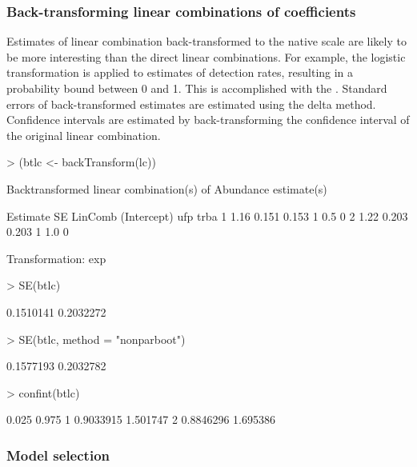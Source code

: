 \documentclass[article,shortnames]{jss}
\begin{document}
\subsubsection{Back-transforming linear combinations of coefficients}

Estimates of linear combination back-transformed to the native scale
are likely to be more interesting than the direct linear combinations.
For example, the logistic transformation is applied to estimates of
detection rates, resulting in a probability bound between 0 and
1. This is accomplished with the .  Standard
errors of back-transformed estimates are estimated using the delta
method.  Confidence intervals are estimated by back-transforming the
confidence interval of the original linear combination.

\begin{Schunk}
\begin{Sinput}
> (btlc <- backTransform(lc))
\end{Sinput}
\begin{Soutput}
Backtransformed linear combination(s) of Abundance estimate(s)

  Estimate    SE LinComb (Intercept) ufp trba
1     1.16 0.151   0.153           1 0.5    0
2     1.22 0.203   0.203           1 1.0    0

Transformation: exp 
\end{Soutput}
\begin{Sinput}
> SE(btlc)
\end{Sinput}
\begin{Soutput}
[1] 0.1510141 0.2032272
\end{Soutput}
\begin{Sinput}
> SE(btlc, method = "nonparboot")
\end{Sinput}
\begin{Soutput}
[1] 0.1577193 0.2032782
\end{Soutput}
\begin{Sinput}
> confint(btlc)
\end{Sinput}
\begin{Soutput}
      0.025    0.975
1 0.9033915 1.501747
2 0.8846296 1.695386
\end{Soutput}
\end{Schunk}


\subsubsection{Model selection} 
\end{document}
